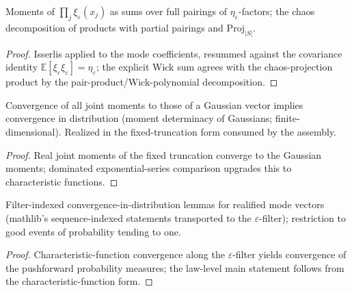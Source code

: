 \begin{lemma}\label{P-wick}
  \leanok
  Moments of \(\prod_j \xi_\varepsilon(x_j)\) as sums over full pairings of
  \(\eta_\varepsilon\)-factors; the chaos decomposition of products with
  partial pairings and \(\mathrm{Proj}_{\lvert S\rvert}\).
\end{lemma}
\begin{proof}\leanok
  Isserlis applied to the mode coefficients, resummed against the
  covariance identity \(\mathbb{E}[\xi_\varepsilon\xi_\varepsilon] =
  \eta_\varepsilon\); the explicit Wick sum agrees with the chaos-projection
  product by the pair-product/Wick-polynomial decomposition.
\end{proof}

\begin{lemma}\label{I-gaussmm}
  \leanok
  Convergence of all joint moments to those of a Gaussian vector implies
  convergence in distribution (moment determinacy of Gaussians;
  finite-dimensional). Realized in the
  fixed-truncation form consumed by the assembly.
\end{lemma}
\begin{proof}\leanok
  Real joint moments of the fixed truncation converge to the Gaussian
  moments; dominated exponential-series comparison upgrades this to
  characteristic functions.
\end{proof}

\begin{lemma}\label{I-weakconv}
  \leanok
  Filter-indexed convergence-in-distribution lemmas for realified mode
  vectors (mathlib's sequence-indexed statements transported to the
  \(\varepsilon\)-filter); restriction to good events of probability
  tending to one.
\end{lemma}
\begin{proof}\leanok
  Characteristic-function convergence along the \(\varepsilon\)-filter
  yields convergence of the pushforward probability measures; the
  law-level main statement follows from the characteristic-function
  form.
\end{proof}
